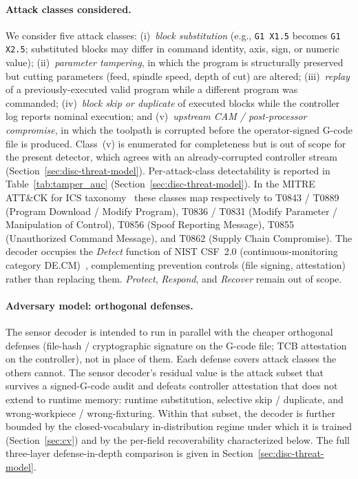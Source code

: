\documentclass[sensors,article,submit,moreauthors,pdftex]{Definitions/mdpi}
\begin{document}
\paragraph{Attack classes considered.} We consider five attack classes: (i)~\emph{block substitution} (e.g., \texttt{G1 X1.5} becomes \texttt{G1 X2.5}; substituted blocks may differ in command identity, axis, sign, or numeric value); (ii)~\emph{parameter tampering}, in which the program is structurally preserved but cutting parameters (feed, spindle speed, depth of cut) are altered; (iii)~\emph{replay} of a previously-executed valid program while a different program was commanded; (iv)~\emph{block skip or duplicate} of executed blocks while the controller log reports nominal execution; and (v)~\emph{upstream CAM / post-processor compromise}, in which the toolpath is corrupted before the operator-signed G-code file is produced. Class~(v) is enumerated for completeness but is out of scope for the present detector, which agrees with an already-corrupted controller stream (Section~\ref{sec:disc-threat-model}). Per-attack-class detectability is reported in Table~\ref{tab:tamper_auc} (Section~\ref{sec:disc-threat-model}). In the MITRE ATT\&CK for ICS taxonomy~\cite{mitre_attack_ics} these classes map respectively to T0843 / T0889 (Program Download / Modify Program), T0836 / T0831 (Modify Parameter / Manipulation of Control), T0856 (Spoof Reporting Message), T0855 (Unauthorized Command Message), and T0862 (Supply Chain Compromise). The decoder occupies the \emph{Detect} function of NIST CSF~2.0 (continuous-monitoring category DE.CM)~\cite{nistcsf2}, complementing prevention controls (file signing, attestation) rather than replacing them. \emph{Protect}, \emph{Respond}, and \emph{Recover} remain out of scope.

\paragraph{Adversary model: orthogonal defenses.} The sensor decoder is intended to run in parallel with the cheaper orthogonal defenses (file-hash / cryptographic signature on the G-code file; TCB attestation on the controller), not in place of them. Each defense covers attack classes the others cannot. The sensor decoder's residual value is the attack subset that survives a signed-G-code audit and defeats controller attestation that does not extend to runtime memory: runtime substitution, selective skip / duplicate, and wrong-workpiece / wrong-fixturing. Within that subset, the decoder is further bounded by the closed-vocabulary in-distribution regime under which it is trained (Section~\ref{sec:cv}) and by the per-field recoverability characterized below. The full three-layer defense-in-depth comparison is given in Section~\ref{sec:disc-threat-model}.
\end{document}
